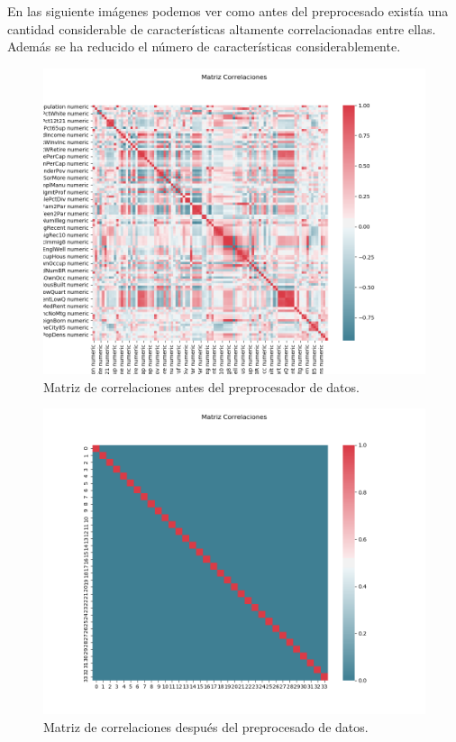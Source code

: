 \documentclass[size=a4, parskip=half, titlepage=false, toc=flat, toc=bib, 12pt]{scrartcl}
\begin{document}
En las siguiente imágenes podemos ver como antes del preprocesado existía una cantidad considerable de características altamente correlacionadas entre ellas. Además se ha reducido el número de características considerablemente.

\begin{figure}[H]
\centering
\includegraphics[width=1\textwidth]{./img/corrantereg}
\caption{Matriz de correlaciones antes del preprocesador de datos.}
\end{figure}
\begin{figure}[H]
\centering
\includegraphics[width=1\textwidth]{./img/corrdespreg}
\caption{Matriz de correlaciones después del preprocesado de datos.}
\end{figure}
\end{document}
